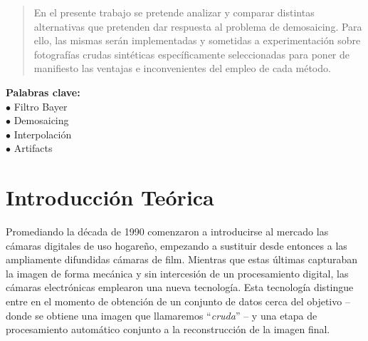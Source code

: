 \documentclass[a4paper]{article}
\begin{document}
\thispagestyle{empty}

\maketitle
\newpage

\thispagestyle{empty}
\vfill
\begin{abstract}
En el presente trabajo se pretende analizar y comparar distintas alternativas que pretenden dar respuesta al problema de demosaicing. Para ello, las mismas serán implementadas y sometidas a experimentación sobre fotografías crudas sintéticas específicamente seleccionadas para poner de manifiesto las ventajas e inconvenientes del empleo de cada método. \\
\end{abstract}

\noindent \textbf{Palabras clave:} \\
$\bullet$ Filtro Bayer \\
$\bullet$ Demosaicing \\
$\bullet$ Interpolaci\'on \\
$\bullet$ Artifacts \\



\thispagestyle{empty}
\vspace{3cm}
\tableofcontents
\newpage


\newpage

\section{Introducci\'on Te\'orica}

Promediando la década de 1990 comenzaron a introducirse al mercado las cámaras digitales de uso hogareño, empezando a sustituir desde entonces a las ampliamente difundidas cámaras de film. 
Mientras que estas últimas capturaban la imagen de forma mecánica y sin intercesión de un procesamiento digital, las cámaras electrónicas emplearon una nueva tecnología. Esta tecnolog\'ia distingue entre en el momento de obtención de un conjunto de datos cerca del objetivo – donde se obtiene una imagen que llamaremos “\textit{cruda}” – y una etapa de procesamiento automático conjunto a la reconstrucción de la imagen final. \\
\end{document}
